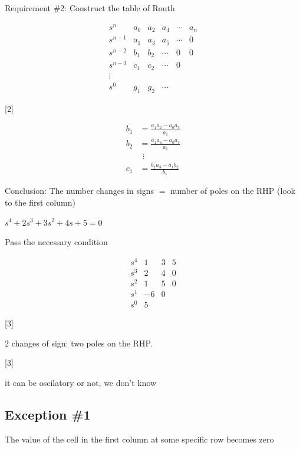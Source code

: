 \documentclass[11pt,a4paper]{article}
\begin{document}
Requirement \#2: Construct the table of Routh

\[
\begin{array}{c|ccccc}
s^{n}   & a_0 & a_2 & a_4 & \cdots & a_n\\
s^{n-1} & a_1 & a_3 & a_5 & \cdots & 0\\
s^{n-2} & b_1 & b_2 & \cdots & 0 & 0\\
s^{n-3} & c_1 & c_2 & \cdots & 0 & \\
\vdots  &     &     &        &   & \\
s^{0}   & g_1 & g_2 & \cdots &   &
\end{array}
\]

[2]

\begin{align*}
b_1&=\frac{a_1a_2-a_0a_3}{a_1}\\[6pt]
b_2&=\frac{a_1a_4-a_0a_5}{a_1}\\
&\ \,\vdots\\
c_1&=\frac{b_1a_3-a_1b_2}{b_1}
\end{align*}

Conclusion: The number changes in signs $=$ number of poles on the RHP (look to the first column)

\begin{ornek}
$s^4+2s^3+3s^2+4s+5=0$
\end{ornek}

Pass the necessary condition

\[
\begin{array}{c|ccc}
s^4 & 1 & 3 & 5\\
s^3 & 2 & 4 & 0\\
s^2 & 1 & 5 & 0\\
s^1 & -6 & 0 & \\
s^0 & 5 & &
\end{array}
\]

[3]

2 changes of sign: two poles on the RHP.

[3]

it can be oscilatory or not, we don't know

\subsection{Exception \#1}

The value of the cell in the first column at some specific row becomes zero
\end{document}

